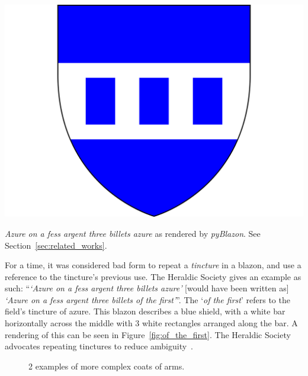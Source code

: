 \documentclass[nobib, a4paper, twoside, justified]{tufte-book}
\makeatletter
\newcommand{\blazon}{\gls{blazon}\@\xspace}
\makeatother
\begin{document}
\begin{marginfigure}
  \centering
  \includegraphics[width=\linewidth]{of_the_first}
  \caption{\textit{Azure on a fess argent three billets azure} as rendered by \textit{pyBlazon}.
  See Section~\ref{sec:related_works}.}%
  \label{fig:of_the_first}
\end{marginfigure}

For a time, it was considered bad form to repeat a \textit{tincture} in a \blazon, and use a
reference to the tincture's previous use. The Heraldic Society gives an example as such:
``\textit{`Azure on a fess argent three billets azure'} [would have been written as] \textit{`Azure
on a fess argent three billets of the first'}''. The `\textit{of the first}' refers to the field's
tincture of azure. This \blazon describes a blue shield, with a white bar horizontally across the
middle with 3 white rectangles arranged along the bar. A rendering of this can be seen in
Figure~\ref{fig:of_the_first}. The Heraldic Society advocates repeating
tinctures to reduce ambiguity~\autocite{blazon_in_coa}.

\begin{figure}[h]
  \qquad
  \caption{2 examples of more complex coats of arms.}\label{fig:complex_shields}
\end{figure}
\end{document}
